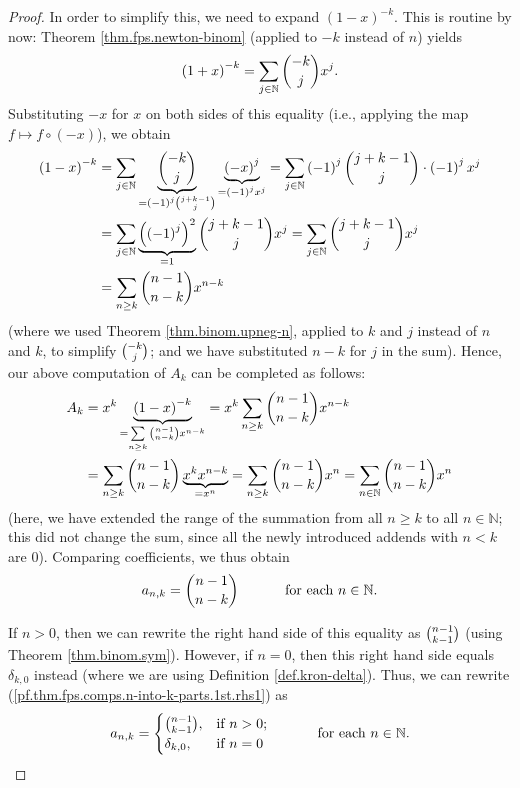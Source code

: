 \begin{proof}
In order to simplify this, we need to expand $\left(  1-x\right)  ^{-k}$. This
is routine by now: Theorem \ref{thm.fps.newton-binom} (applied to $-k$ instead
of $n$) yields%
\[
\left(  1+x\right)  ^{-k}=\sum_{j\in\mathbb{N}}\dbinom{-k}{j}x^{j}.
\]
Substituting $-x$ for $x$ on both sides of this equality (i.e., applying the
map $f\mapsto f\circ\left(  -x\right)  $), we obtain%
\begin{align}
\left(  1-x\right)  ^{-k}  &  =\sum_{j\in\mathbb{N}}\underbrace{\dbinom{-k}%
{j}}_{=\left(  -1\right)  ^{j}\dbinom{j+k-1}{j}}\underbrace{\left(  -x\right)  ^{j}}_{=\left(
-1\right)  ^{j}x^{j}}=\sum_{j\in\mathbb{N}}\left(  -1\right)  ^{j}%
\dbinom{j+k-1}{j}\cdot\left(  -1\right)  ^{j}x^{j}\nonumber\\
&  =\sum_{j\in\mathbb{N}}\underbrace{\left(  \left(  -1\right)  ^{j}\right)
^{2}}_{=1}\dbinom{j+k-1}{j}x^{j}=\sum_{j\in\mathbb{N}}\dbinom{j+k-1}{j}%
x^{j}\label{pf.thm.fps.comps.num-comps-n-k.1-x-k}\\
&  =\sum\limits_{n\geq k}\dbinom{n-1}{n-k}x^{n-k}\nonumber
\end{align}
(where we used Theorem \ref{thm.binom.upneg-n}, applied to $k$ and $j$ instead of $n$ and $k$, to simplify $\dbinom{-k}{j}$;
and we have substituted $n-k$ for $j$ in the sum). Hence, our above
computation of $A_{k}$ can be completed as follows:
\begin{align*}
A_{k}  &  =x^{k}\underbrace{\left(  1-x\right)  ^{-k}}_{=\sum\limits_{n\geq
k}\dbinom{n-1}{n-k}x^{n-k}}=x^{k}\sum\limits_{n\geq k}\dbinom{n-1}{n-k}%
x^{n-k}\\
&  =\sum\limits_{n\geq k}\dbinom{n-1}{n-k}\underbrace{x^{k}x^{n-k}}_{=x^{n}%
}=\sum\limits_{n\geq k}\dbinom{n-1}{n-k}x^{n}=\sum\limits_{n\in\mathbb{N}%
}\dbinom{n-1}{n-k}x^{n}%
\end{align*}
(here, we have extended the range of the summation from all $n\geq k$ to all
$n\in\mathbb{N}$; this did not change the sum, since all the newly introduced
addends with $n<k$ are $0$). Comparing coefficients, we thus obtain%
\begin{equation}
a_{n,k}=\dbinom{n-1}{n-k}\ \ \ \ \ \ \ \ \ \ \text{for each }n\in\mathbb{N}.
\label{pf.thm.fps.comps.n-into-k-parts.1st.rhs1}%
\end{equation}

If $n>0$, then we can rewrite the right hand side of this equality as
$\dbinom{n-1}{k-1}$ (using Theorem \ref{thm.binom.sym}). However, if $n=0$,
then this right hand side equals $\delta_{k,0}$ instead (where we are using
Definition \ref{def.kron-delta}). Thus, we can rewrite
(\ref{pf.thm.fps.comps.n-into-k-parts.1st.rhs1}) as%
\begin{equation}
a_{n,k}=%
\begin{cases}
\dbinom{n-1}{k-1}, & \text{if }n>0;\\
\delta_{k,0}, & \text{if }n=0
\end{cases}
\ \ \ \ \ \ \ \ \ \ \text{for each }n\in\mathbb{N}.
\label{pf.thm.fps.comps.n-into-k-parts.1st.rhs2}%
\end{equation}


\end{proof}
